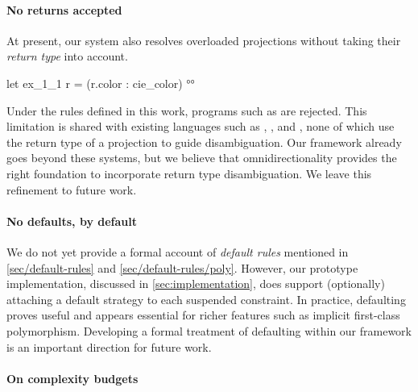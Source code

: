 \documentclass[acmsmall,screen,nonacm%
\Anonymous{,anonymous}{}%
\Final{}{,review}%
]{acmart}
\begin{document}
\paragraph{No returns accepted}
At present, our system also resolves overloaded projections without taking their
\emph{return type} into account.
%
\begin{program}
let ex_1_1 r = (r.color : cie_color) °°
\end{program}
%
Under the rules defined in this work, programs such as  are
rejected. This limitation is shared with existing languages such as \OCaml,
\Haskell, and \SML, none of which use the return type of a projection to guide
disambiguation. Our framework already goes beyond these systems, but we believe
that omnidirectionality provides the right foundation to incorporate return
type disambiguation. We leave this refinement to future work.


\paragraph{No defaults, by default}


We do not yet provide a formal account of \emph{default rules} mentioned in
\cref{sec/default-rules} and \cref{sec/default-rules/poly}.  However, our
prototype implementation, discussed in \cref{sec:implementation}, does support
(optionally) attaching a default strategy to each suspended constraint.
 In
practice, defaulting proves useful and appears essential for richer features
such as implicit first-class polymorphism.
%
Developing a formal treatment of defaulting within our framework is an
important direction for future work.

\paragraph{On complexity budgets}
\end{document}
